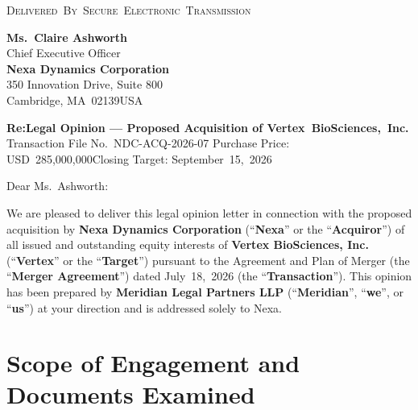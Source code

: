 \documentclass[11pt,a4paper]{scrartcl}
\begin{document}
\noindent
{\color{SlateGray}\small\textsc{Delivered~By~Secure~Electronic~Transmission}}\par\vspace{4mm}

\noindent
\textbf{Ms.~Claire Ashworth}\\
Chief Executive Officer\\
\textbf{Nexa Dynamics Corporation}\\
350 Innovation Drive, Suite 800\\
Cambridge, MA~02139\quad USA

\vspace{7mm}

\begin{tcolorbox}[
  sideline,
  left=12pt
]
  {\color{NavyDeep}\bfseries Re:\enspace Legal Opinion --- Proposed Acquisition of Vertex~Bio\-Sciences,~Inc.}\\
  {\color{SlateGray}\small Transaction File No.~NDC-ACQ-2026-07\quad\textbullet\quad
   Purchase Price: USD~285,000,000\quad\textbullet\quad Closing Target: September~15,~2026}
\end{tcolorbox}

\vspace{4mm}

Dear Ms.~Ashworth:

We are pleased to deliver this legal opinion letter in connection with the proposed acquisition
by \textbf{Nexa Dynamics Corporation} (``\textbf{Nexa}'' or the ``\textbf{Acquiror}'') of all
issued and outstanding equity interests of \textbf{Vertex BioSciences, Inc.} (``\textbf{Vertex}''
or the ``\textbf{Target}'') pursuant to the Agreement and Plan of Merger (the
``\textbf{Merger Agreement}'') dated July~18,~2026 (the ``\textbf{Transaction}''). This opinion
has been prepared by \textbf{Meridian Legal Partners LLP} (``\textbf{Meridian}'',
``\textbf{we}'', or ``\textbf{us}'') at your direction and is addressed solely to Nexa.

\section{Scope of Engagement and Documents Examined}
\end{document}
